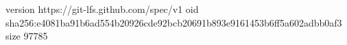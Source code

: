 version https://git-lfs.github.com/spec/v1
oid sha256:e4081ba91b6ad554b20926cde92bcb20691b893e9161453b6ff5a602adbb0af3
size 97785
